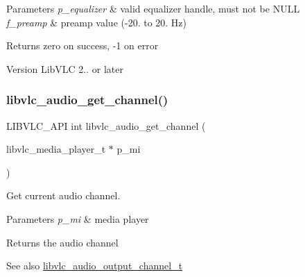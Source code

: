 \begin{DoxyParams}{Parameters}
{\em p\+\_\+equalizer} & valid equalizer handle, must not be N\+U\+LL \\
\hline
{\em f\+\_\+preamp} & preamp value (-\/20. to 20. Hz) \\
\hline
\end{DoxyParams}
\begin{DoxyReturn}{Returns}
zero on success, -\/1 on error 
\end{DoxyReturn}
\begin{DoxyVersion}{Version}
Lib\+V\+LC 2.. or later 
\end{DoxyVersion}
\mbox{\label{group__libvlc__audio_gad8f6f73c42a73a189100bb9eb6418be0}} 
\subsubsection{\texorpdfstring{libvlc\+\_\+audio\+\_\+get\+\_\+channel()}{libvlc\_audio\_get\_channel()}}
{\footnotesize\ttfamily L\+I\+B\+V\+L\+C\+\_\+\+A\+PI int libvlc\+\_\+audio\+\_\+get\+\_\+channel (\begin{DoxyParamCaption}\item[{libvlc\+\_\+media\+\_\+player\+\_\+t $\ast$}]{p\+\_\+mi }\end{DoxyParamCaption})}

Get current audio channel.


\begin{DoxyParams}{Parameters}
{\em p\+\_\+mi} & media player \\
\hline
\end{DoxyParams}
\begin{DoxyReturn}{Returns}
the audio channel 
\end{DoxyReturn}
\begin{DoxySeeAlso}{See also}
\hyperlink{group__libvlc__audio_ga50e752d67eaa2738e0f914805b1b3a05}{libvlc\+\_\+audio\+\_\+output\+\_\+channel\+\_\+t} 
\end{DoxySeeAlso}
\mbox{\label{group__libvlc__audio_gab843aa707ea125e630acb086909d5962}} 
